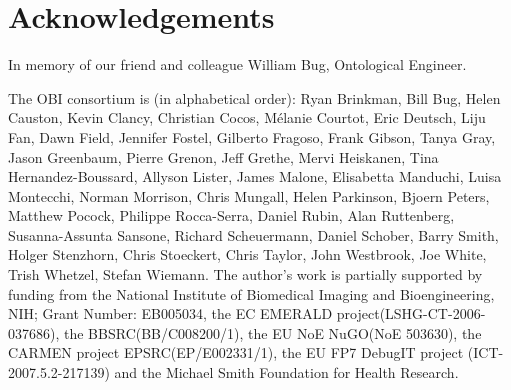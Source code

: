 \documentclass{elsart}       %
\begin{document}
\section{Acknowledgements}

In memory of our friend and colleague William Bug, Ontological Engineer. 

The OBI consortium is (in alphabetical order): Ryan Brinkman, Bill Bug, Helen Causton, Kevin Clancy, Christian Cocos, M\'elanie Courtot, Eric Deutsch, Liju Fan, Dawn Field, Jennifer Fostel, Gilberto Fragoso, Frank Gibson, Tanya Gray, Jason Greenbaum, Pierre Grenon, Jeff Grethe, Mervi Heiskanen, Tina Hernandez-Boussard, Allyson Lister, James Malone, Elisabetta Manduchi, Luisa Montecchi, Norman Morrison, Chris Mungall, Helen Parkinson, Bjoern Peters, Matthew Pocock, Philippe Rocca-Serra, Daniel Rubin, Alan Ruttenberg, Susanna-Assunta Sansone, Richard Scheuermann, Daniel Schober, Barry Smith, Holger Stenzhorn, Chris Stoeckert, Chris Taylor, John Westbrook,  Joe White, Trish Whetzel, Stefan Wiemann. The author’s work is partially supported by funding from the National Institute of Biomedical Imaging and Bioengineering, NIH; Grant Number: EB005034, the EC EMERALD project(LSHG-CT-2006-037686), the BBSRC(BB/C008200/1), the EU NoE NuGO(NoE 503630), the CARMEN project EPSRC(EP/E002331/1), the EU FP7 DebugIT project (ICT-2007.5.2-217139) and the Michael Smith Foundation for Health Research.





\end{document}
